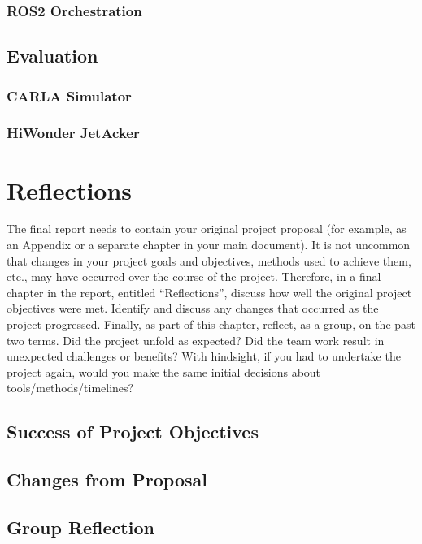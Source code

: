 \documentclass[titlepage]{article}
\begin{document}
\subsubsection{ROS2 Orchestration}

\subsection{Evaluation}

\subsubsection{CARLA Simulator}
\subsubsection{HiWonder JetAcker}

\section{Reflections}

The final report needs to contain your original project proposal 
(for example, as an Appendix or a separate chapter in your main 
document). It is not uncommon that changes in your project goals 
and objectives, methods used to achieve them, etc., may have 
occurred over the course of the project. Therefore, in a final 
chapter in the report, entitled “Reflections”, discuss how well 
the original project objectives were met. Identify and discuss any
changes that occurred as the project progressed. Finally, as part 
of this chapter, reflect, as a group, on the past two terms. Did 
the project unfold as expected? Did the team work result in unexpected 
challenges or benefits? With hindsight, if you had to undertake the 
project again, would you make the same initial decisions about 
tools/methods/timelines?

\subsection{Success of Project Objectives}

\subsection{Changes from Proposal}

\subsection{Group Reflection}
\end{document}
